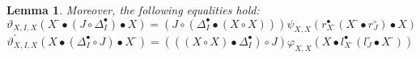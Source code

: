\documentclass[nosumlimits,twoside]{amsart}
\newtheorem{lemma}[lemma]{\sc Lemma}
\theoremstyle{definition}
\theoremstyle{remark}
\def\revsn{\text{-}}
\begin{document}
\begin{lemma}
Moreover, the following equalities hold:
\begin{equation}\label{form:varthetaI}
\vartheta _{X,I,X}\left( X^{\revsn }\bullet \left( J\circ \Delta _{I}^{\bullet
}\right) \bullet X\right) =\left( J\circ \left( \Delta _{I}^{\bullet
}\bullet \left( X\circ X\right) \right) \right) \psi _{X,X}\left( r_{X^{\revsn
}}^{\bullet }\left( X^{\revsn }\bullet r_{J}^{\circ }\right)
\bullet X\right)
\end{equation}%
\begin{equation}
\label{form:vartheta1I}
\vartheta _{X,I,X}^{\prime }\left( X\bullet \left( \Delta _{I}^{\bullet
}\circ J\right) \bullet X^{\revsn }\right) =\left( \left( \left( X\circ
X\right) \bullet \Delta _{I}^{\bullet }\right) \circ J\right) \varphi
_{X,X}\left( X\bullet l_{X^{\revsn }}^{\bullet }\left( l_{J}^{\circ
}\bullet X^{\revsn }\right) \right)
\end{equation}%
\end{lemma}
\end{document}
